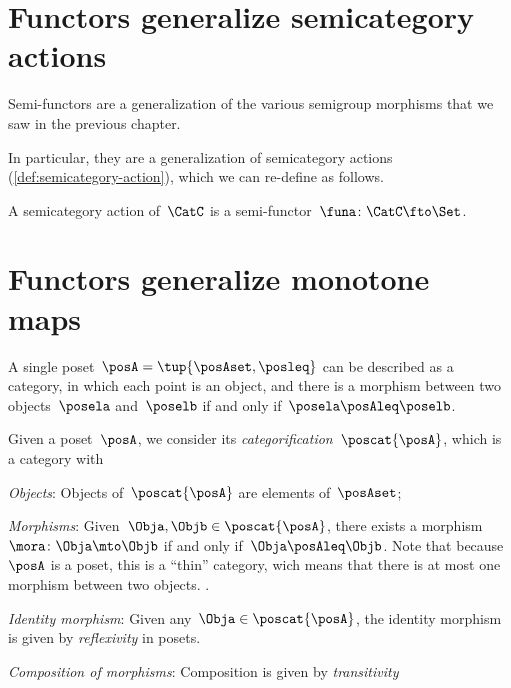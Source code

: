 
\section[\dots as semicategory actions]{Functors generalize semicategory actions}


Semi-functors are a generalization of the various semigroup morphisms that we saw in the previous chapter.


In particular, they are a generalization of semicategory actions (\cref{def:semicategory-action}), which we can re-define as follows.

\begin{ctdefinition}
	A semicategory action of~$\CatC$ is a semi-functor~$\funa\colon \CatC \fto \Set$.
\end{ctdefinition}

\section[\dots as monotone maps]{Functors generalize monotone maps}
\label{sec:posetsarecats}


A single poset~$\posA=\tup{\posAset, \posleq}$ can be described as a category, in which each point is an object, and there is a morphism between two objects~$\posela$ and~$\poselb$ if and only if~$\posela \posAleq \poselb$.

\begin{ctdefinition}
	Given a poset~$\posA$, we consider its \emph{categorification}~$\poscat{\posA}$, which is a category with
	\begin{compactenum}
		\item \emph{Objects}: Objects of~$\poscat{\posA}$ are elements of~$\posAset$;
		\item \emph{Morphisms}: Given~$\Obja,\Objb\in \poscat{\posA}$, there exists a morphism~$\mora\colon \Obja\mto \Objb$ if and only if~$\Obja \posAleq \Objb$.
		Note that because~$\posA$ is a poset, this is a ``thin'' category, wich means that there is at most one morphism between two objects.
		.
		\item \emph{Identity morphism}: Given any~$\Obja \in \poscat{\posA}$, the identity morphism is given by \emph{reflexivity} in posets.
		\item \emph{Composition of morphisms}: Composition is given by \emph{transitivity}
	\end{compactenum}
\end{ctdefinition}

